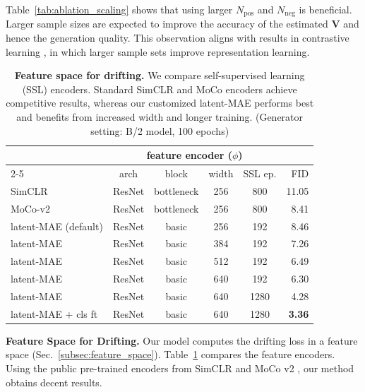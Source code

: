 \documentclass{article}
\newcommand{\tablestyle}[2]{\setlength{\tabcolsep}{#1}\renewcommand{\arraystretch}{#2}\centering
\small
}
\newcommand\tablefontsize{%
  \fontsize{8pt}{9pt}\selectfont
}
\newcommand{\vv}[1]{\mathbf{#1}}
\newcommand{\V}{\vv{V}}
\renewcommand{\paragraph}[1]{\vspace{.05em}\noindent\textbf{#1}}
\theoremstyle{plain}
\theoremstyle{definition}
\theoremstyle{remark}
\begin{document}
Table~\ref{tab:ablation_scaling} shows that using larger $N_\text{pos}$ and $N_\text{neg}$ is beneficial. Larger sample sizes are expected to improve the accuracy of the estimated $\V$ and hence the generation quality.
This observation aligns with results in contrastive learning \cite{oord2018representation,he2020momentum,chen2020simple}, in which larger sample sets improve representation learning.

\begin{table}[t]
    \centering
    \caption{\textbf{Feature space for drifting.}
    We compare self-supervised learning (SSL) encoders.
    Standard SimCLR and MoCo encoders achieve competitive results, whereas our customized latent-MAE performs best and benefits from increased width and longer training.
    (Generator setting: B/2 model, 100 epochs)
    }
    \label{tab:ablation_drift_space}
    \tablestyle{3pt}{1.02}
    \tablefontsize
    \begin{tabular}{l | c c c c | r}
    \toprule
    \multicolumn{1}{c}{} & \multicolumn{4}{c}{feature encoder ($\phi$)} & \\
    \cmidrule(lr){2-5}
    \multicolumn{1}{c}{SSL method} & arch & block & width & \multicolumn{1}{c}{SSL ep.} & FID \\
    \midrule
    SimCLR & ResNet & bottleneck & 256 & 800 & 11.05 \\
    MoCo-v2 & ResNet & bottleneck & 256 & 800 & 8.41 \\
    \midrule
    latent-MAE (default) & ResNet & basic & 256 & 192 & 8.46 \\
    latent-MAE & ResNet & basic & 384 & 192 & 7.26 \\
    latent-MAE & ResNet & basic & 512 & 192 & 6.49 \\
    latent-MAE & ResNet & basic & 640 & 192 & 6.30 \\
    \midrule
    latent-MAE & ResNet & basic & 640 & 1280 & 4.28 \\
    latent-MAE + cls ft & ResNet & basic & 640 & 1280 & \textbf{3.36} \\
    \bottomrule
    \end{tabular}
\end{table}

\paragraph{Feature Space for Drifting.}
Our model computes the drifting loss in a feature space (Sec.~\ref{subsec:feature_space}). Table~\ref{tab:ablation_drift_space} compares the feature encoders.
Using the public pre-trained encoders from SimCLR \cite{chen2020simple} and MoCo v2 \cite{chen2020improved}, our method obtains decent results.
\end{document}
